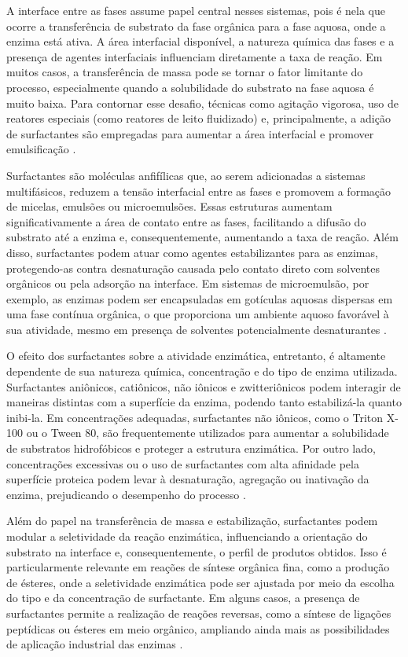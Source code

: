 \documentclass[12pt,oneside]{report}
\begin{document}
A interface entre as fases assume papel central nesses sistemas, pois é nela que ocorre a transferência de substrato da fase orgânica para a fase aquosa, onde a enzima está ativa. A área interfacial disponível, a natureza química das fases e a presença de agentes interfaciais influenciam diretamente a taxa de reação. Em muitos casos, a transferência de massa pode se tornar o fator limitante do processo, especialmente quando a solubilidade do substrato na fase aquosa é muito baixa. Para contornar esse desafio, técnicas como agitação vigorosa, uso de reatores especiais (como reatores de leito fluidizado) e, principalmente, a adição de surfactantes são empregadas para aumentar a área interfacial e promover emulsificação \cite{schmid2002enzyme}.

Surfactantes são moléculas anfifílicas que, ao serem adicionadas a sistemas multifásicos, reduzem a tensão interfacial entre as fases e promovem a formação de micelas, emulsões ou microemulsões. Essas estruturas aumentam significativamente a área de contato entre as fases, facilitando a difusão do substrato até a enzima e, consequentemente, aumentando a taxa de reação. Além disso, surfactantes podem atuar como agentes estabilizantes para as enzimas, protegendo-as contra desnaturação causada pelo contato direto com solventes orgânicos ou pela adsorção na interface. Em sistemas de microemulsão, por exemplo, as enzimas podem ser encapsuladas em gotículas aquosas dispersas em uma fase contínua orgânica, o que proporciona um ambiente aquoso favorável à sua atividade, mesmo em presença de solventes potencialmente desnaturantes \cite{lau2010surfactants}.

O efeito dos surfactantes sobre a atividade enzimática, entretanto, é altamente dependente de sua natureza química, concentração e do tipo de enzima utilizada. Surfactantes aniônicos, catiônicos, não iônicos e zwitteriônicos podem interagir de maneiras distintas com a superfície da enzima, podendo tanto estabilizá-la quanto inibi-la. Em concentrações adequadas, surfactantes não iônicos, como o Triton X-100 ou o Tween 80, são frequentemente utilizados para aumentar a solubilidade de substratos hidrofóbicos e proteger a estrutura enzimática. Por outro lado, concentrações excessivas ou o uso de surfactantes com alta afinidade pela superfície proteica podem levar à desnaturação, agregação ou inativação da enzima, prejudicando o desempenho do processo \cite{lau2010surfactants}.

Além do papel na transferência de massa e estabilização, surfactantes podem modular a seletividade da reação enzimática, influenciando a orientação do substrato na interface e, consequentemente, o perfil de produtos obtidos. Isso é particularmente relevante em reações de síntese orgânica fina, como a produção de ésteres, onde a seletividade enzimática pode ser ajustada por meio da escolha do tipo e da concentração de surfactante. Em alguns casos, a presença de surfactantes permite a realização de reações reversas, como a síntese de ligações peptídicas ou ésteres em meio orgânico, ampliando ainda mais as possibilidades de aplicação industrial das enzimas \cite{lau2010surfactants}.
\end{document}
